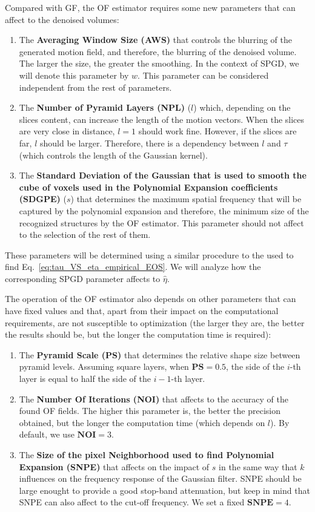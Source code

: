 Compared with GF, the OF estimator requires some new parameters
\cite{farneback2003two} that can affect to the denoised volumes:
\begin{enumerate}
\item The \textbf{Averaging Window Size (AWS)} that controls the
  blurring of the generated motion field, and therefore, the blurring
  of the denoised volume. The larger the size, the greater the
  smoothing. In the context of SPGD, we will denote this parameter by
  $w$. This parameter can be considered independent from the rest of
  parameters.
\item The \textbf{Number of Pyramid Layers (NPL)} ($l$) which,
  depending on the slices content, can increase the length of the
  motion vectors. When the slices are very close in distance, $l=1$
  should work fine. However, if the slices are far, $l$ should be
  larger. Therefore, there is a dependency between $l$ and $\tau$
  (which controls the length of the Gaussian kernel).
\item The \textbf{Standard Deviation of the Gaussian that is used to
    smooth the cube of voxels used in the Polynomial Expansion
    coefficients (SDGPE)} ($s$) that determines the maximum spatial
  frequency that will be captured by the polynomial expansion and
  therefore, the minimum size of the recognized structures by the OF
  estimator. This parameter should not affect to the selection of the
  rest of them.
\end{enumerate}
These parameters will be determined using a similar procedure to the
used to find Eq.~\ref{eq:tau_VS_eta_empirical_EOS}. We will analyze how the corresponding SPGD parameter affects to $\hat{\eta}$.

The operation of the OF estimator also depends on other parameters
that can have fixed values and that, apart from their impact on the
computational requirements, are not susceptible to optimization (the
larger they are, the better the results should be, but the longer the
computation time is required):
\begin{enumerate}
\item The \textbf{Pyramid Scale (PS)} that determines the relative
  shape size between pyramid levels. Assuming square layers, when
  $\mathbf{PS}=0.5$, the side of the $i$-th layer is equal to half the
  side of the $i-1$-th layer.
\item The \textbf{Number Of Iterations (NOI)} that affects to the
  accuracy of the found OF fields. The higher this parameter is, the
  better the precision obtained, but the longer the computation time
  (which depends on $l$). By default, we use $\mathbf{NOI}=3$.
\item The \textbf{Size of the pixel Neighborhood used to find
    Polynomial Expansion (SNPE)} that affects on the impact of $s$ in
  the same way that $k$ influences on the frequency response of the
  Gaussian filter. SNPE should be large enought to provide a good
  stop-band attenuation, but keep in mind that SNPE can also affect to
  the cut-off frequency. We set a fixed $\mathbf{SNPE}=4$.
\end{enumerate}

